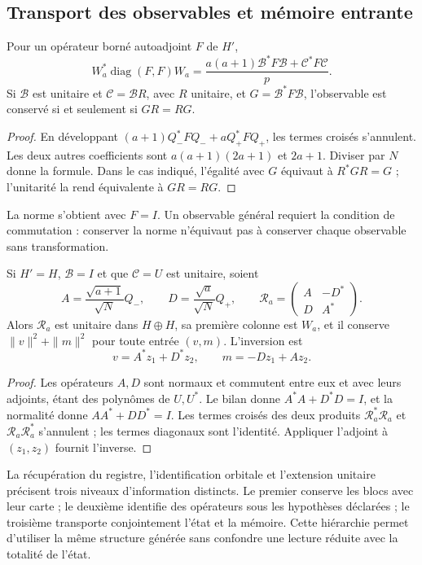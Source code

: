 \subsection{Transport des observables et mémoire entrante}
\label{iv:subsec:acoplamiento-lectores}

\begin{theorem}
\label{iv:thm:acoplamiento-lector}
Pour un opérateur borné autoadjoint \(F\) de \(H'\),
\[
 W_a^*\operatorname{diag}(F,F)W_a
 =\frac{a(a+1)\mathcal B^*F\mathcal B+\mathcal C^*F\mathcal C}{p}.
\]
Si \(\mathcal B\) est unitaire et \(\mathcal C=\mathcal BR\), avec
\(R\) unitaire, et \(G=\mathcal B^*F\mathcal B\), l’observable est
conservé si et seulement si \(GR=RG\).
\end{theorem}
\begin{proof}
En développant \((a+1)Q_-^*FQ_-+aQ_+^*FQ_+\), les termes croisés
s’annulent. Les deux autres coefficients sont
\(a(a+1)(2a+1)\) et \(2a+1\). Diviser par \(N\) donne la formule.
Dans le cas indiqué, l’égalité avec \(G\) équivaut à \(R^*GR=G\) ;
l’unitarité la rend équivalente à \(GR=RG\).
\end{proof}

La norme s’obtient avec \(F=I\). Un observable général requiert
la condition de commutation : conserver la norme n’équivaut pas à conserver
chaque observable sans transformation.

\begin{theorem}
\label{iv:thm:acoplamiento-memoria}
Si \(H'=H\), \(\mathcal B=I\) et que \(\mathcal C=U\) est unitaire, soient
\[
 A=\frac{\sqrt{a+1}}{\sqrt N}Q_-,\qquad
 D=\frac{\sqrt a}{\sqrt N}Q_+,\qquad
 \mathscr R_a=\begin{pmatrix}A&-D^*\\D&A^*\end{pmatrix}.
\]
Alors \(\mathscr R_a\) est unitaire dans \(H\oplus H\), sa première
colonne est \(W_a\), et il conserve \(\|v\|^2+\|m\|^2\) pour toute
entrée \((v,m)\). L’inversion est
\[
 v=A^*z_1+D^*z_2,\qquad m=-Dz_1+Az_2.
\]
\end{theorem}
\begin{proof}
Les opérateurs \(A,D\) sont normaux et commutent entre eux et avec leurs
adjoints, étant des polynômes de \(U,U^*\). Le bilan donne
\(A^*A+D^*D=I\), et la normalité donne \(AA^*+DD^*=I\).
Les termes croisés des deux produits
\(\mathscr R_a^*\mathscr R_a\) et \(\mathscr R_a\mathscr R_a^*\)
s’annulent ; les termes diagonaux sont l’identité. Appliquer l’adjoint à
\((z_1,z_2)\) fournit l’inverse.
\end{proof}

La récupération du registre, l’identification orbitale et l’extension
unitaire précisent trois niveaux d’information distincts. Le premier
conserve les blocs avec leur carte ; le deuxième identifie des opérateurs sous
les hypothèses déclarées ; le troisième transporte conjointement l’état et la
mémoire. Cette hiérarchie permet d’utiliser la même structure générée sans
confondre une lecture réduite avec la totalité de l’état.
